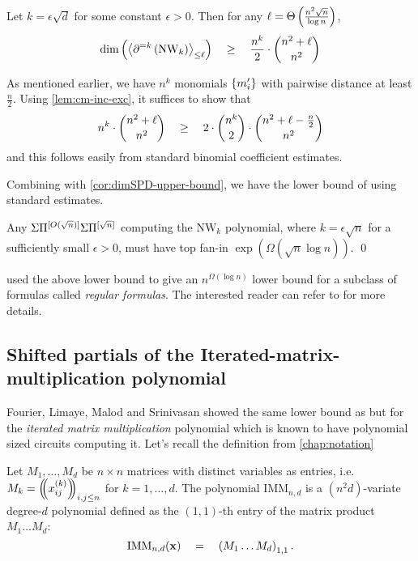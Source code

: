 \begin{theorem}
Let $k = \epsilon \sqrt{d}$ for some constant $\epsilon > 0$. 
Then for any  $\ell = \Theta\left(\frac{n^2 \sqrt{n}}{\log n}\right)$,
$$
\dim\left(\left\langle\partial^{=k}\left(\mathrm{NW}_k\right)\right\rangle_{\leq \ell}\right) \quad \geq \quad \frac{n^k}{2} \cdot \binom{n^2 + \ell}{n^2}
$$
\end{theorem}
\begin{proof-sketch}
As mentioned earlier, we have $n^k$ monomials $\left\{m_i'\right\}$ with pairwise distance at least $\frac{n}{2}$. 
Using \autoref{lem:cm-inc-exc}, it suffices to show that
$$
n^k \cdot \binom{n^2 + \ell}{n^2} \quad \geq \quad 2 \cdot \binom{n^k}{2} \cdot \binom{n^2 + \ell - \frac{n}{2}}{n^2}
$$
and this follows easily from standard binomial coefficient estimates. 
\end{proof-sketch}

Combining with \autoref{cor:dimSPD-upper-bound}, we have the lower bound of \cite{KSS13} using standard estimates. 

\begin{theorem}
Any $\Sigma\Pi^{[O(\sqrt{n})]}\Sigma\Pi^{[\sqrt{n}]}$ computing the $\mathrm{NW}_k$ polynomial, where $k = \epsilon \sqrt{n}$ for a sufficiently small $\epsilon > 0$, must have top fan-in $\exp(\Omega(\sqrt{n}\log n))$. \qed
\end{theorem}

\cite{KSS13} used the above lower bound to give an $n^{\Omega(\log n)}$ lower bound for a subclass of formulas called \emph{regular formulas}. 
The interested reader can refer to \cite{KSS13} for more details. 

\subsection{Shifted partials of the Iterated-matrix-multiplication polynomial}

Fourier, Limaye, Malod and Srinivasan \cite{FLMS13} showed the same lower bound as \cite{KSS13} but for the \emph{iterated matrix multiplication} polynomial which is known to have polynomial sized circuits computing it. Let's recall the definition from \autoref{chap:notation}

\begin{definition*}
Let $M_1,\dots, M_d$ be $n\times n$ matrices with distinct variables as entries, i.e. $M_k = \left(\!\!\left(x_{ij}^{(k)}\right)\!\!\right)_{i,j\leq n}$ for $k = 1,\dots, d$. 
The polynomial $\mathrm{IMM}_{n,d}$ is a $(n^2d)$-variate degree-$d$ polynomial defined as the $(1,1)$-th entry of the matrix product $M_1\dots M_d$:
$$
\mathrm{IMM}_{n,d}(\mathbf{x}) \quad = \quad \left(M_1 \dots M_d\right)_{1,1}.
$$
\end{definition*}

